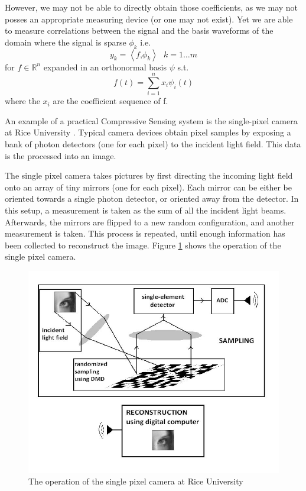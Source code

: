 However, we may not be able to directly obtain those coefficients, as we may not posses an appropriate measuring device (or one may not exist). Yet we are able to measure correlations between the signal and the basis waveforms of the domain where the signal is sparse \(\phi_{k}\) i.e. 
%
\begin{equation}
y_{k} = \left\langle f \text{,} \phi_{k} \right\rangle \text{ } k = 1 \ldots m
\end{equation}
%
for \( f \in \mathbb{R}^n \) expanded in an orthonormal basis \( \psi \) s.t.
%
\begin{equation}
f(t) = \sum_{i = 1}^n x_{i}\psi_{i}(t) 
\end{equation}
%
where the \(x_{i} \) are the coefficient sequence of f. 

An example of a practical Compressive Sensing system is the single-pixel camera at Rice University \cite{Duarte2008}. Typical camera devices obtain pixel samples by exposing a bank of photon detectors (one for each pixel) to the incident light field. This data is the processed into an image.

The single pixel camera takes pictures by first directing the incoming light field onto an array of tiny mirrors (one for each pixel). Each mirror can be either be oriented towards a single photon detector, or oriented away from the detector. In this setup, a measurement is taken as the sum of all the incident light beams. Afterwards, the mirrors are flipped to a new random configuration, and another measurement is taken. This process is repeated, until enough information has been collected to reconstruct the image. Figure \ref{singlepixelcamera} shows the operation of the single pixel camera.

\begin{figure}[h]
\centering
\includegraphics[height = 7 cm]{singlepixel.png}
\caption{The operation of the single pixel camera at Rice University \cite{singlepixelimaging}}
\label{singlepixelcamera}
\end{figure}

